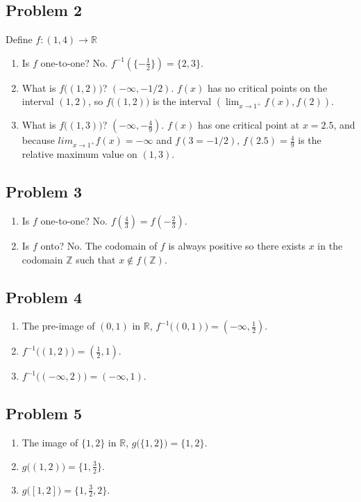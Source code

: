 \documentclass{article}
\begin{document}
\subsection*{Problem 2}
Define \(f: (1,4)\rightarrow\mathbb{R}\)
\begin{enumerate}[label=(\alph*)]
	\item Is \(f\) one-to-one? No. \(f^{-1}(\{-\frac{1}{2}\})=\{2,3\}\).
	\item What is \(f\big((1,2)\big)\)? \((-\infty, -1/2)\). \(f(x)\) has no critical points on the interval \((1,2)\), so \(f\big((1,2)\big)\) is the interval \((\lim_{x\rightarrow 1^+}f(x),f(2))\).
	\item What is \(f\big((1,3)\big)\)? \((-\infty, -\frac{4}{9})\). \(f(x)\) has one critical point at \(x=2.5\), and because \(lim_{x\rightarrow 1^+}f(x)=-\infty\) and \(f(3=-1/2)\), \(f(2.5)=\frac{4}{9}\) is the relative maximum value on \((1,3)\).
\end{enumerate}
\subsection*{Problem 3}
\begin{enumerate}[label=(\alph*)]
	\item Is \(f\) one-to-one? No. \(f(\frac{4}{3})=f(-\frac{2}{3})\).
	\item Is \(f\) onto? No. The codomain of \(f\) is always positive so there exists \(x\) in the codomain \(\mathbb{Z}\) such that \(x\notin f(\mathbb{Z})\).
\end{enumerate}
\subsection*{Problem 4}
\begin{enumerate}[label=(\alph*)]
	\item The pre-image of \((0,1)\) in \(\mathbb{R}\), \(f^{-1}\big((0,1)\big)=(-\infty, \frac{1}{2})\).
	\item \(f^{-1}\big((1,2)\big)=(\frac{1}{2}, 1)\).
	\item \(f^{-1}\big((-\infty, 2)\big)=(-\infty, 1)\).
\end{enumerate}
\subsection*{Problem 5}
\begin{enumerate}[label=(\alph*)]
	\item The image of \(\{1,2\}\) in \(\mathbb{R}\), \(g\big(\{1,2\}\big)=\{1,2\}\).
	\item \(g\big((1,2)\big)=\{1,\frac{3}{2}\}\).
	\item \(g\big([1,2]\big)=\{1,\frac{3}{2},2\}\).
\end{enumerate}
\end{document}
